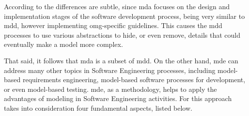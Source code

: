 According to \cite{Sommerville:2015} the differences are subtle, since \ac{mda} focuses on the design and implementation stages of the software development process, being very similar to \ac{mdd}, however implementing \ac{omg}-specific guidelines.
This causes the \ac{mdd} processes to use various abstractions to hide, or even remove, details that could eventually make a model more complex.


That said, it follows that \ac{mda} is a subset of \ac{mdd}.
On the other hand, \ac{mde} can address many other topics in Software Engineering processes, including model-based requirements engineering, model-based software processes for development, or even model-based testing.
\ac{mde}, as a methodology, helps to apply the advantages of modeling in Software Engineering activities.
For \cite{Brambilla:2017} this approach takes into consideration four fundamental aspects, listed below.


